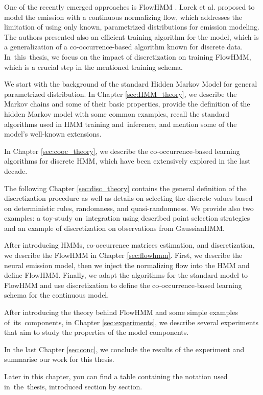 \documentclass[shortabstract]{iithesis}
\begin{document}
One of the recently emerged approaches is FlowHMM \cite{lorek2022flowhmm}. Lorek et al. proposed to model the emission with a continuous normalizing flow, which addresses the limitation of using only known, parametrized distributions for emission modeling. The authors presented also an efficient training algorithm for the model, which is a generalization of a co-occurrence-based algorithm known for discrete data. 
In~this~thesis, we focus on the impact of discretization on training FlowHMM, which is a crucial step in the mentioned training schema. 

We start with the background of the standard Hidden Markov Model for general parametrized distribution. In Chapter \ref{sec:HMM_theory}, we describe the Markov chains and some of their basic properties, provide the definition of the hidden Markov model with some common examples, recall the standard algorithms used in HMM training and~inference, and mention some of the model's well-known extensions. 

In Chapter \ref{sec:cooc_theory}, we describe the co-occurrence-based learning algorithms for discrete HMM, which have been extensively explored in the last decade. 

The following Chapter \ref{sec:disc_theory} contains the general definition of the discretization procedure as well as details on selecting the discrete values based on deterministic rules, randomness, and quasi-randomness. We provide also two examples: a toy-study on~integration using described point selection strategies and an example of discretization on observations from GaussianHMM. 

After introducing HMMs, co-occurrence matrices estimation, and discretization, we describe the FlowHMM in Chapter \ref{sec:flowhmm}. First, we describe the neural emission model, then we inject the normalizing flow into the HMM and define FlowHMM. Finally, we adapt the algorithms for the standard model to FlowHMM and use discretization to define the co-occurrence-based learning schema for the continuous model. 

After introducing the theory behind FlowHMM and some simple examples of~its~components, in Chapter \ref{sec:experiments}, we describe several experiments that aim to study the properties of the model components. 

In the last Chapter \ref{sec:conc}, we conclude the results of the experiment and summarise our work for this thesis. 

Later in this chapter, you can find a table containing the notation used in~the~thesis, introduced section by section. 
\end{document}
